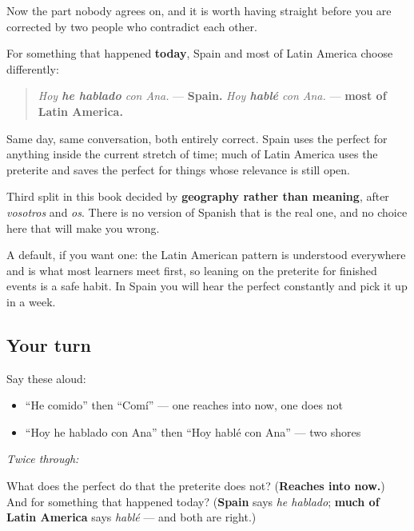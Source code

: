 \begin{culture}
Now the part nobody agrees on, and it is worth having straight before you are corrected by two people who contradict each other.

For something that happened \textbf{today}, Spain and most of Latin America choose differently:

\begin{quote}
\emph{Hoy \textbf{he hablado} con Ana.} — \textbf{Spain.} \emph{Hoy \textbf{hablé} con Ana.} — \textbf{most of Latin America.}
\end{quote}

Same day, same conversation, both entirely correct. Spain uses the perfect for anything inside the current stretch of time; much of Latin America uses the preterite and saves the perfect for things whose relevance is still open.

Third split in this book decided by \textbf{geography rather than meaning}, after \emph{vosotros} and \emph{os}. There is no version of Spanish that is the real one, and no choice here that will make you wrong.

A default, if you want one: the Latin American pattern is understood everywhere and is what most learners meet first, so leaning on the preterite for finished events is a safe habit. In Spain you will hear the perfect constantly and pick it up in a week.
\end{culture}

\subsection*{Your turn}
Say these aloud:

\begin{itemize}
\raggedright
  \item \textquotedblleft{}He comido\textquotedblright{} then \textquotedblleft{}Comí\textquotedblright{} — one reaches into now, one does not
  \item \textquotedblleft{}Hoy he hablado con Ana\textquotedblright{} then \textquotedblleft{}Hoy hablé con Ana\textquotedblright{} — two shores
\end{itemize}

\emph{Twice through:}

\begin{tcolorbox}[breakable,colback=teal!4,colframe=teal!35!black,title={Before you move on}]
What does the perfect do that the preterite does not? (\textbf{Reaches into now.}) And for something that happened today? (\textbf{Spain} says \emph{he hablado}; \textbf{much of Latin America} says \emph{hablé} — and both are right.)
\end{tcolorbox}

